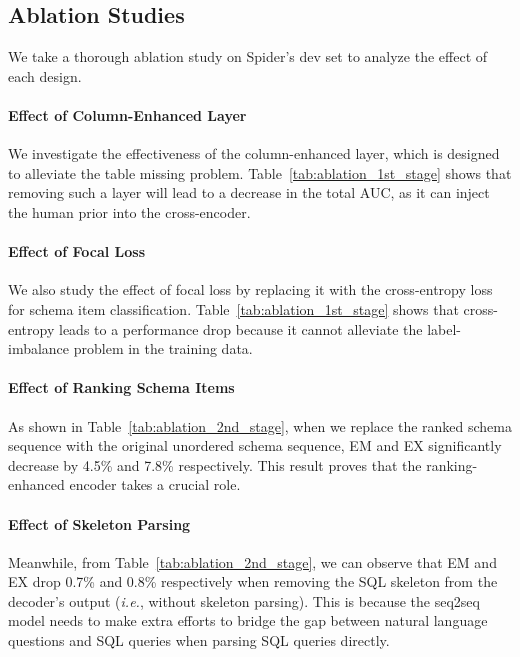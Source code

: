 \documentclass[letterpaper]{article} \usepackage{aaai23}  \usepackage{times}  \usepackage{helvet}  \usepackage{courier}  \usepackage[hyphens]{url}  \usepackage{graphicx} \urlstyle{rm} \def\UrlFont{\rm}  \usepackage{natbib}  \usepackage{caption} \frenchspacing  \setlength{\pdfpagewidth}{8.5in}  \setlength{\pdfpageheight}{11in}  \usepackage{algorithm}
\begin{document}
\subsection{Ablation Studies}
We take a thorough ablation study on Spider's dev set to analyze the effect of each design.

\paragraph{Effect of Column-Enhanced Layer} We investigate the effectiveness of the column-enhanced layer, which is designed to alleviate the table missing problem. Table~\ref{tab:ablation_1st_stage} shows that removing such a layer will lead to a decrease in the total AUC, as it can inject the human prior into the cross-encoder.

\paragraph{Effect of Focal Loss} We also study the effect of focal loss by replacing it with the cross-entropy loss for schema item classification. Table~\ref{tab:ablation_1st_stage} shows that cross-entropy leads to a performance drop because it cannot alleviate the label-imbalance problem in the training data. 

\paragraph{Effect of Ranking Schema Items} As shown in Table~\ref{tab:ablation_2nd_stage}, when we replace the ranked schema sequence with the original unordered schema sequence, EM and EX significantly decrease by 4.5\% and 7.8\% respectively. This result proves that the ranking-enhanced encoder takes a crucial role.

\paragraph{Effect of Skeleton Parsing} Meanwhile, from Table~\ref{tab:ablation_2nd_stage}, we can observe that EM and EX drop 0.7\% and 0.8\% respectively when removing the SQL skeleton from the decoder's output (\emph{i.e.}, without skeleton parsing). This is because the seq2seq model needs to make extra efforts to bridge the gap between natural language questions and SQL queries when parsing SQL queries directly.
\end{document}
